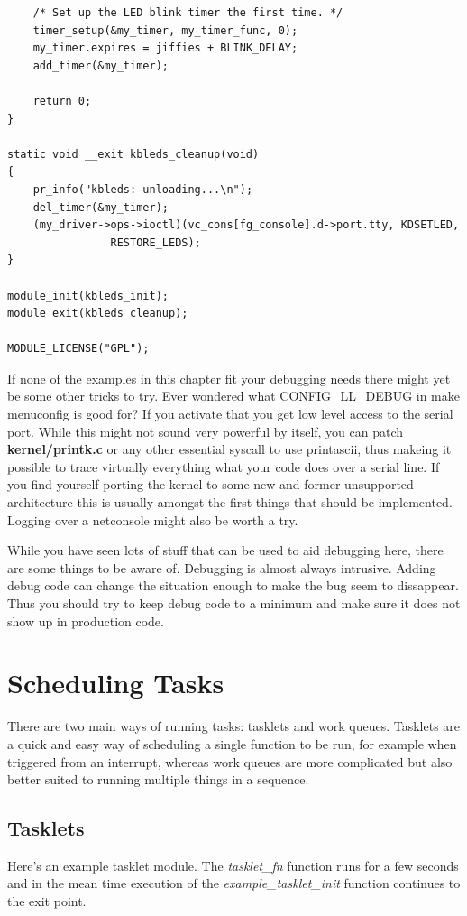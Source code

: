 \documentclass[11pt]{article}
\begin{document}
\begin{verbatim}
    /* Set up the LED blink timer the first time. */
    timer_setup(&my_timer, my_timer_func, 0);
    my_timer.expires = jiffies + BLINK_DELAY;
    add_timer(&my_timer);

    return 0;
}

static void __exit kbleds_cleanup(void)
{
    pr_info("kbleds: unloading...\n");
    del_timer(&my_timer);
    (my_driver->ops->ioctl)(vc_cons[fg_console].d->port.tty, KDSETLED,
			    RESTORE_LEDS);
}

module_init(kbleds_init);
module_exit(kbleds_cleanup);

MODULE_LICENSE("GPL");
\end{verbatim}

If none of the examples in this chapter fit your debugging needs there might yet be some other tricks to try. Ever wondered what CONFIG\_LL\_DEBUG in make menuconfig is good for? If you activate that you get low level access to the serial port. While this might not sound very powerful by itself, you can patch \textbf{kernel/printk.c} or any other essential syscall to use printascii, thus makeing it possible to trace virtually everything what your code does over a serial line. If you find yourself porting the kernel to some new and former unsupported architecture this is usually amongst the first things that should be implemented. Logging over a netconsole might also be worth a try.

While you have seen lots of stuff that can be used to aid debugging here, there are some things to be aware of. Debugging is almost always intrusive. Adding debug code can change the situation enough to make the bug seem to dissappear. Thus you should try to keep debug code to a minimum and make sure it does not show up in production code.

\section{Scheduling Tasks}
\label{sec:org1903a2d}
There are two main ways of running tasks: tasklets and work queues. Tasklets are a quick and easy way of scheduling a single function to be run, for example when triggered from an interrupt, whereas work queues are more complicated but also better suited to running multiple things in a sequence.

\subsection{Tasklets}
\label{sec:org43446d6}
Here's an example tasklet module. The \emph{tasklet\_fn} function runs for a few seconds and in the mean time execution of the \emph{example\_tasklet\_init} function continues to the exit point.
\end{document}

